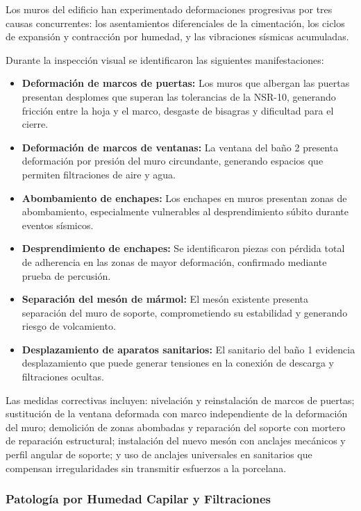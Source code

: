 ﻿\documentclass[12pt]{article}
\begin{document}
Los muros del edificio han experimentado deformaciones progresivas por tres causas
concurrentes: los asentamientos diferenciales de la cimentación, los ciclos de
expansión y contracción por humedad, y las vibraciones sísmicas acumuladas.

Durante la inspección visual se identificaron las siguientes manifestaciones:

\begin{itemize}[noitemsep]
  \item {\bfseries Deformación de marcos de puertas:} Los muros que albergan las
  puertas presentan desplomes que superan las tolerancias de la NSR-10, generando
  fricción entre la hoja y el marco, desgaste de bisagras y dificultad para el cierre.
  \item {\bfseries Deformación de marcos de ventanas:} La ventana del baño 2 presenta
  deformación por presión del muro circundante, generando espacios que permiten
  filtraciones de aire y agua.
  \item {\bfseries Abombamiento de enchapes:} Los enchapes en muros presentan zonas
  de abombamiento, especialmente vulnerables al desprendimiento súbito durante
  eventos sísmicos.
  \item {\bfseries Desprendimiento de enchapes:} Se identificaron piezas con pérdida
  total de adherencia en las zonas de mayor deformación, confirmado mediante prueba
  de percusión.
  \item {\bfseries Separación del mesón de mármol:} El mesón existente presenta
  separación del muro de soporte, comprometiendo su estabilidad y generando riesgo
  de volcamiento.
  \item {\bfseries Desplazamiento de aparatos sanitarios:} El sanitario del baño 1
  evidencia desplazamiento que puede generar tensiones en la conexión de descarga
  y filtraciones ocultas.
\end{itemize}

Las medidas correctivas incluyen: nivelación y reinstalación de marcos de puertas;
sustitución de la ventana deformada con marco independiente de la deformación del
muro; demolición de zonas abombadas y reparación del soporte con mortero de
reparación estructural; instalación del nuevo mesón con anclajes mecánicos y perfil
angular de soporte; y uso de anclajes universales en sanitarios que compensan
irregularidades sin transmitir esfuerzos a la porcelana.

\subsubsection{Patología por Humedad Capilar y Filtraciones}
\end{document}
